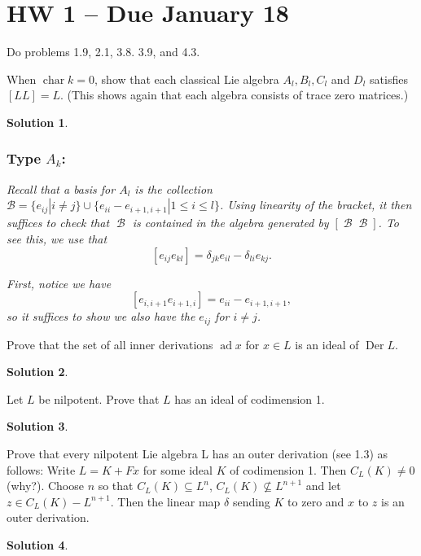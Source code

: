 \documentclass[12pt]{article}
\newenvironment{hwprob}[1]
{\renewcommand{\theprob}{#1}%
 \addtocounter{thm}{-1}%
 \begin{prob}}
{\end{prob}}
\theoremstyle{nonumberbreak}
\newtheorem{sol}{Solution}
\theoremstyle{changebreak}
\theoremstyle{nonumberbreak}
\theoremstyle{change}
\DeclareMathOperator{\ch}{char}
\DeclareMathOperator{\calB}{\mathcal{B}}
\DeclareMathOperator{\ad}{ad}
\DeclareMathOperator{\Der}{Der}
\begin{document}
\newpage

\section*{HW 1 -- Due January 18}
Do problems 1.9, 2.1, 3.8. 3.9, and 4.3.

\begin{hwprob}{1.9}
	When $\ch k=0$, show that each classical Lie algebra $A_l,B_l, C_l$ and $D_l$ satisfies $[LL]=L$. (This shows again that each algebra consists of trace zero matrices.)
\end{hwprob}
\begin{sol}
	\subsubsection*{Type $A_k$:}
	Recall that a basis for $A_l$ is the collection $\mathcal{B}=\{e_{ij}|i\ne j\}\cup\{e_{ii}-e_{i+1,i+1}|1\le i\le l\}$. Using linearity of the bracket,
	it then suffices to check that $\calB$ is contained in the algebra generated by $[\calB \calB]$. To see this, we use that
	\[[e_{ij}e_{kl}]=\delta_{jk}e_{il}-\delta_{li}e_{kj}.\]

	First, notice we have
	\[[e_{i,i+1}e_{i+1,i}]=e_{ii}-e_{i+1,i+1},\]
	so it suffices to show we also have the $e_{ij}$ for $i\ne j$.

\end{sol}

\begin{hwprob}{2.1}
	Prove that the set of all inner derivations $\ad x$ for $x\in L$ is an ideal of $\Der L$.
\end{hwprob}
\begin{sol}

\end{sol}

\begin{hwprob}{3.8}
	Let $L$ be nilpotent. Prove that $L$ has an ideal of codimension 1.
\end{hwprob}
\begin{sol}

\end{sol}

\begin{hwprob}{3.9}
	Prove that every nilpotent Lie algebra L has an outer derivation (see 1.3) as follows: Write $L=K+Fx$
	for some ideal $K$ of codimension 1. Then $C_L(K)\ne 0$ (why?). Choose $n$ so that $C_L(K)\subseteq L^n$,
	$C_L(K)\not\subseteq L^{n+1}$ and let $z\in C_L(K)-L^{n+1}$. Then the linear map $\delta$ sending $K$ to zero
	and $x$ to $z$ is an outer derivation.
\end{hwprob}
\begin{sol}

\end{sol}
\end{document}
